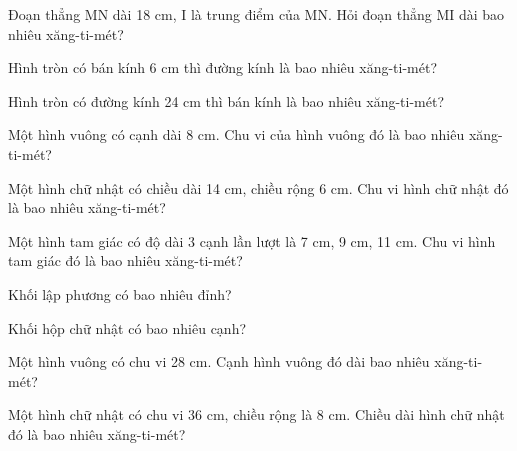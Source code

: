 \begin{ex}
Đoạn thẳng MN dài 18 cm, I là trung điểm của MN. Hỏi đoạn thẳng MI dài bao nhiêu xăng-ti-mét?
\end{ex}

\begin{ex}
Hình tròn có bán kính 6 cm thì đường kính là bao nhiêu xăng-ti-mét?
\end{ex}

\begin{ex}
Hình tròn có đường kính 24 cm thì bán kính là bao nhiêu xăng-ti-mét?
\end{ex}

\begin{ex}
Một hình vuông có cạnh dài 8 cm. Chu vi của hình vuông đó là bao nhiêu xăng-ti-mét?
\end{ex}

\begin{ex}
Một hình chữ nhật có chiều dài 14 cm, chiều rộng 6 cm. Chu vi hình chữ nhật đó là bao nhiêu xăng-ti-mét?
\end{ex}

\begin{ex}
Một hình tam giác có độ dài 3 cạnh lần lượt là 7 cm, 9 cm, 11 cm. Chu vi hình tam giác đó là bao nhiêu xăng-ti-mét?
\end{ex}

\begin{ex}
Khối lập phương có bao nhiêu đỉnh?
\end{ex}

\begin{ex}
Khối hộp chữ nhật có bao nhiêu cạnh?
\end{ex}

\begin{ex}
Một hình vuông có chu vi 28 cm. Cạnh hình vuông đó dài bao nhiêu xăng-ti-mét?
\end{ex}

\begin{ex}
Một hình chữ nhật có chu vi 36 cm, chiều rộng là 8 cm. Chiều dài hình chữ nhật đó là bao nhiêu xăng-ti-mét?
\end{ex}

